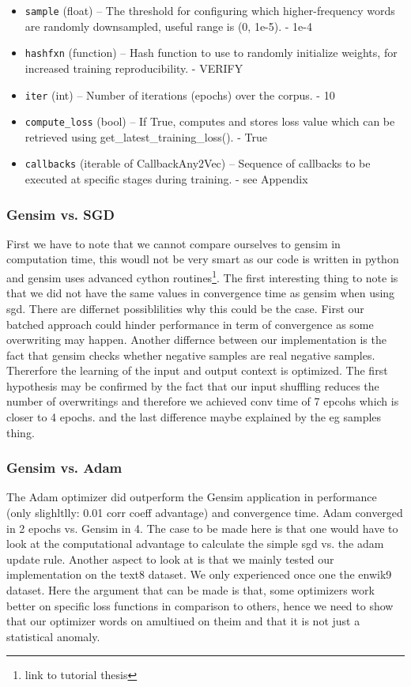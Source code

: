 \begin{itemize}
 \item   \texttt{sample} (float) – The threshold for configuring which higher-frequency words are randomly downsampled, useful range is (0, 1e-5). - 1e-4
   \item \texttt{hashfxn} (function) – Hash function to use to randomly initialize weights, for increased training reproducibility. - VERIFY 
  \item  \texttt{iter} (int) – Number of iterations (epochs) over the corpus. - 10 
 \
  \item  \texttt{compute\_loss} (bool) – If True, computes and stores loss value which can be retrieved using get\_latest\_training\_loss(). - True
 \item   \texttt{callbacks} (iterable of CallbackAny2Vec) – Sequence of callbacks to be executed at specific stages during training. - see Appendix
\end{itemize}

\subsubsection{Gensim vs. SGD}
First we have to note that we cannot compare ourselves to gensim in computation time, this woudl not be very smart as our code is written in python and gensim uses advanced cython routines\footnote{link to tutorial thesis}. 
The first interesting thing to note is that we did not have the same values in convergence time as gensim when using sgd. There are differnet possiblilities why this could be the case. First our batched approach could hinder performance in term of convergence as some overwriting may happen. Another differnce between our implementation is the fact that gensim checks whether negative samples are real negative samples. Thererfore the learning of the input and output context is optimized. 
The first hypothesis may be confirmed by the fact that our input shuffling reduces the number of overwritings and therefore we achieved conv time of 7 epcohs which is closer to 4 epochs. and the last difference maybe explained by the eg samples thing. 

\subsubsection{Gensim vs. Adam}
The Adam optimizer did outperform the Gensim application in performance (only slighltlly: 0.01 corr coeff advantage) and convergence time. Adam converged in 2 epochs vs. Gensim in 4. The case to be made here is that one would have to look at the computational advantage to calculate the simple sgd vs.  the adam update rule. Another aspect to look at is that we mainly tested our implementation on the text8 dataset. We only experienced once one the enwik9 dataset. Here the argument that can be made is that, some optimizers work better on specific loss functions in comparison to others, hence we need to show that our optimizer words on amultiued on theim and that it is not just a statistical anomaly.

